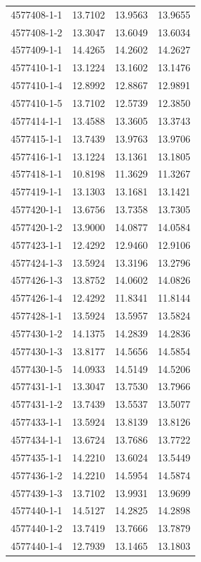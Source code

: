 \begin{longtable}{lrrr}
4577408-1-1 & 13.7102 & 13.9563 & 13.9655 \\
4577408-1-2 & 13.3047 & 13.6049 & 13.6034 \\
4577409-1-1 & 14.4265 & 14.2602 & 14.2627 \\
4577410-1-1 & 13.1224 & 13.1602 & 13.1476 \\
4577410-1-4 & 12.8992 & 12.8867 & 12.9891 \\
4577410-1-5 & 13.7102 & 12.5739 & 12.3850 \\
4577414-1-1 & 13.4588 & 13.3605 & 13.3743 \\
4577415-1-1 & 13.7439 & 13.9763 & 13.9706 \\
4577416-1-1 & 13.1224 & 13.1361 & 13.1805 \\
4577418-1-1 & 10.8198 & 11.3629 & 11.3267 \\
4577419-1-1 & 13.1303 & 13.1681 & 13.1421 \\
4577420-1-1 & 13.6756 & 13.7358 & 13.7305 \\
4577420-1-2 & 13.9000 & 14.0877 & 14.0584 \\
4577423-1-1 & 12.4292 & 12.9460 & 12.9106 \\
4577424-1-3 & 13.5924 & 13.3196 & 13.2796 \\
4577426-1-3 & 13.8752 & 14.0602 & 14.0826 \\
4577426-1-4 & 12.4292 & 11.8341 & 11.8144 \\
4577428-1-1 & 13.5924 & 13.5957 & 13.5824 \\
4577430-1-2 & 14.1375 & 14.2839 & 14.2836 \\
4577430-1-3 & 13.8177 & 14.5656 & 14.5854 \\
4577430-1-5 & 14.0933 & 14.5149 & 14.5206 \\
4577431-1-1 & 13.3047 & 13.7530 & 13.7966 \\
4577431-1-2 & 13.7439 & 13.5537 & 13.5077 \\
4577433-1-1 & 13.5924 & 13.8139 & 13.8126 \\
4577434-1-1 & 13.6724 & 13.7686 & 13.7722 \\
4577435-1-1 & 14.2210 & 13.6024 & 13.5449 \\
4577436-1-2 & 14.2210 & 14.5954 & 14.5874 \\
4577439-1-3 & 13.7102 & 13.9931 & 13.9699 \\
4577440-1-1 & 14.5127 & 14.2825 & 14.2898 \\
4577440-1-2 & 13.7419 & 13.7666 & 13.7879 \\
4577440-1-4 & 12.7939 & 13.1465 & 13.1803 \\

\end{longtable}
